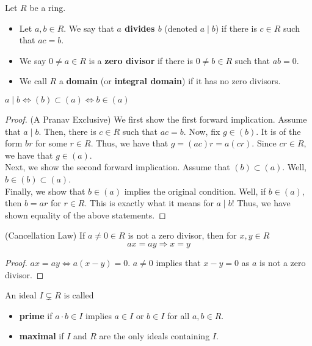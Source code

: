 \begin{defn} \label{Defn 4, Jan 6}
    Let $R$ be a ring.
    \begin{itemize}
        \item Let $a,b \in R$. We say that \textbf{$a$ divides $b$} (denoted $a \mid b$)
        if there is $c \in R$ such that $ac = b$.
        \item We say $0 \neq a \in R$ is a \textbf{zero divisor} if there is
        $0 \neq b \in R$ such that $ab = 0$.
        \item We call $R$ a \textbf{domain} (or \textbf{integral domain}) if it has
        no zero divisors.
    \end{itemize}
\end{defn}
\begin{fact} \label{Fact 5, Jan 6}
    $a \mid b \iff (b) \subset (a) \iff b \in (a)$
\end{fact}
\begin{proof} (A Pranav Exclusive)
    We first show the first forward implication. Assume that $a \mid b$. Then, there is
    $c \in R$ such that $ac = b$. Now, fix $g \in (b)$. It is of the form $br$ for some
    $r \in R$. Thus, we have that $g = (ac)r = a(cr)$. Since $cr \in R$, we have that $g \in (a)$. \\
    Next, we show the second forward implication. Assume that $(b) \subset (a)$. Well,
    $b \in (b) \subset (a)$. \\
    Finally, we show that $b \in (a)$ implies the original condition. Well, if $b \in (a)$, then
    $b = ar$ for $r \in R$. This is exactly what it means for $a \mid b$! Thus, we have
    shown equality of the above statements.
\end{proof}
\begin{fact} \label{Fact 6, Jan 6}(Cancellation Law) If $a \neq 0 \in R$ is not a zero divisor, then
    for $x,y \in R$
    $$
    ax = ay \Rightarrow x = y
    $$
\end{fact}
\begin{proof}
    $ax = ay \iff a(x - y) = 0$. $a \neq 0$ implies that $x - y = 0$ as $a$ is not
    a zero divisor.
\end{proof}
\begin{defn} \label{Defn 7, Jan 6}
    An ideal $I \subsetneq R$ is called
    \begin{itemize}
        \item \textbf{prime} if $a \cdot b \in I$ implies $a \in I$ or $b \in I$ for all $a,b \in R$.
        \item \textbf{maximal} if $I$ and $R$ are the only ideals containing $I$.
    \end{itemize}
\end{defn}
